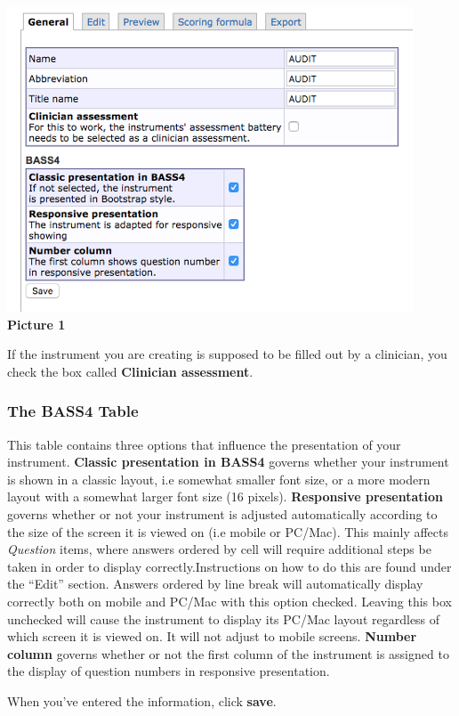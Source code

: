 \documentclass[
]{book}
\begin{document}
\includegraphics{images/new-images/InstrumentsGeneral1.png}
\textbf{Picture 1}

If the instrument you are creating is supposed to be filled out by a clinician, you check the box called \textbf{Clinician assessment}.

\subsubsection{The BASS4 Table}\label{the-bass4-table}

This table contains three options that influence the presentation of your instrument.
\textbf{Classic presentation in BASS4} governs whether your instrument is shown in a classic layout, i.e somewhat smaller font size, or a more modern layout with a somewhat larger font size (16 pixels).
\textbf{Responsive presentation} governs whether or not your instrument is adjusted automatically according to the size of the screen it is viewed on (i.e mobile or PC/Mac). This mainly affects \emph{Question} items, where answers ordered by cell will require additional steps be taken in order to display correctly.Instructions on how to do this are found under the ``Edit'' section.
Answers ordered by line break will automatically display correctly both on mobile and PC/Mac with this option checked.
Leaving this box unchecked will cause the instrument to display its PC/Mac layout regardless of which screen it is viewed on. It will not adjust to mobile screens.
\textbf{Number column} governs whether or not the first column of the instrument is assigned to the display of question numbers in responsive presentation.

When you've entered the information, click \textbf{save}.
\end{document}
